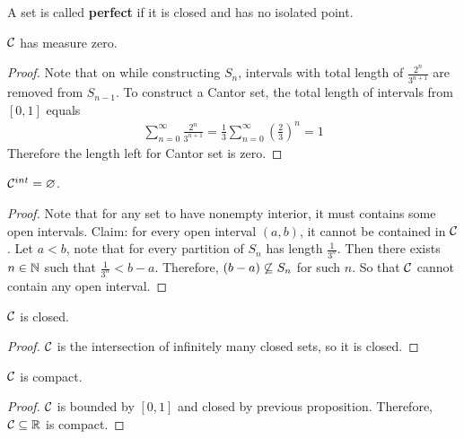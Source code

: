 \documentclass[11pt]{article}
\begin{document}
	\begin{definition}
		A set is called \textbf{perfect} if it is closed and has no isolated point.
	\end{definition}
	
	\begin{proposition}
		$\mathcal{{C}}$ has measure zero.
	\end{proposition}
	
	\begin{proof}
		Note that on while constructing $S_n$, intervals with total length of $\frac{2^n}{3^{n+1}}$ are removed from $S_{n-1}$. To construct a Cantor set, the total length of intervals from $[0, 1]$ equals
		\begin{align}
			\sum_{n=0}^\infty \frac{2^n}{3^{n+1}} = \frac{1}{3} \sum_{n=0}^\infty \left(\frac{2}{3}\right)^n = 1
		\end{align}
		Therefore the length left for Cantor set is zero.
	\end{proof}

	\begin{proposition}
		$\mathcal{{C}}^{int} = \varnothing$.
	\end{proposition}
	
	\begin{proof}
		Note that for any set to have nonempty interior, it must contains some open intervals. Claim: for every open interval $(a, b)$, it cannot be contained in $\mathcal{{C}}$. Let $a < b$, note that for every partition of $S_n$ has length $\frac{1}{3^n}$. Then there exists $n \in \mathbb{N}$ such that $\frac{1}{3^n} < b - a$. Therefore, $(b - a) \centernot \subseteq S_n$ for such $n$. So that $\mathcal{{C}}$ cannot contain any open interval.
	\end{proof}
	
	\begin{proposition}
		$\mathcal{{C}}$ is closed.
	\end{proposition}
	
	\begin{proof}
		$\mathcal{{C}}$ is the intersection of infinitely many closed sets, so it is closed.
	\end{proof}

	\begin{proposition}
		$\mathcal{{C}}$ is compact.
	\end{proposition}
	
	\begin{proof}
		$\mathcal{{C}}$ is bounded by $[0, 1]$ and closed by previous proposition. Therefore, $\mathcal{{C}} \subseteq \mathbb{R}$ is compact.
	\end{proof}
	
\end{document}
